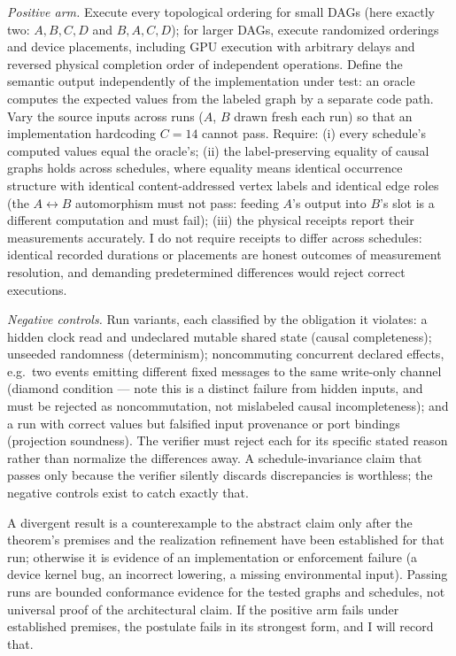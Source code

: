 \documentclass[11pt]{article}
\begin{document}
\textit{Positive arm.} Execute every topological ordering for small DAGs (here exactly two: $A,B,C,D$ and $B,A,C,D$); for larger DAGs, execute randomized orderings and device placements, including GPU execution with arbitrary delays and reversed physical completion order of independent operations. Define the semantic output independently of the implementation under test: an oracle computes the expected values from the labeled graph by a separate code path. Vary the source inputs across runs ($A$, $B$ drawn fresh each run) so that an implementation hardcoding $C = 14$ cannot pass. Require: (i) every schedule's computed values equal the oracle's; (ii) the label-preserving equality of causal graphs holds across schedules, where equality means identical occurrence structure with identical content-addressed vertex labels and identical edge roles (the $A \leftrightarrow B$ automorphism must not pass: feeding $A$'s output into $B$'s slot is a different computation and must fail); (iii) the physical receipts report their measurements accurately. I do not require receipts to differ across schedules: identical recorded durations or placements are honest outcomes of measurement resolution, and demanding predetermined differences would reject correct executions.

\textit{Negative controls.} Run variants, each classified by the obligation it violates: a hidden clock read and undeclared mutable shared state (causal completeness); unseeded randomness (determinism); noncommuting concurrent declared effects, e.g.\ two events emitting different fixed messages to the same write-only channel (diamond condition --- note this is a distinct failure from hidden inputs, and must be rejected as noncommutation, not mislabeled causal incompleteness); and a run with correct values but falsified input provenance or port bindings (projection soundness). The verifier must reject each for its specific stated reason rather than normalize the differences away. A schedule-invariance claim that passes only because the verifier silently discards discrepancies is worthless; the negative controls exist to catch exactly that.

A divergent result is a counterexample to the abstract claim only after the theorem's premises and the realization refinement have been established for that run; otherwise it is evidence of an implementation or enforcement failure (a device kernel bug, an incorrect lowering, a missing environmental input). Passing runs are bounded conformance evidence for the tested graphs and schedules, not universal proof of the architectural claim. If the positive arm fails under established premises, the postulate fails in its strongest form, and I will record that.
\end{document}
